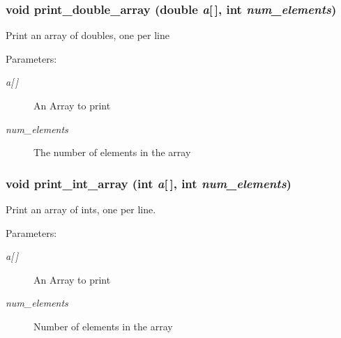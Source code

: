\subsubsection{\setlength{\rightskip}{0pt plus 5cm}void print\_\-double\_\-array (double {\em a}[$\,$], int {\em num\_\-elements})}\label{print__arrays_8c_68be6bfd57f259fd17fd240c8dfd3594}


Print an array of doubles, one per line \begin{Desc}
\item[Parameters:]
\begin{description}
\item[{\em a\mbox{[}$\,$\mbox{]}}]An Array to print \item[{\em num\_\-elements}]The number of elements in the array \end{description}
\end{Desc}
\subsubsection{\setlength{\rightskip}{0pt plus 5cm}void print\_\-int\_\-array (int {\em a}[$\,$], int {\em num\_\-elements})}\label{print__arrays_8c_425daf4767c614afadb74cfb2b0a7a4f}


Print an array of ints, one per line. \begin{Desc}
\item[Parameters:]
\begin{description}
\item[{\em a\mbox{[}$\,$\mbox{]}}]An Array to print \item[{\em num\_\-elements}]Number of elements in the array \end{description}
\end{Desc}
